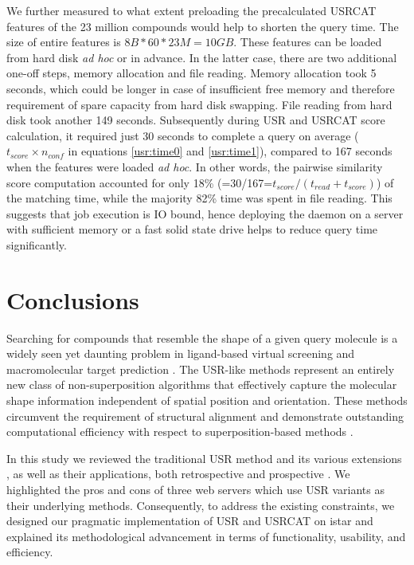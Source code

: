 We further measured to what extent preloading the precalculated USRCAT features of the 23 million compounds would help to shorten the query time. The size of entire features is $8B*60*23M=10GB$. These features can be loaded from hard disk \textit{ad hoc} or in advance. In the latter case, there are two additional one-off steps, memory allocation and file reading. Memory allocation took 5 seconds, which could be longer in case of insufficient free memory and therefore requirement of spare capacity from hard disk swapping. File reading from hard disk took another 149 seconds. Subsequently during USR and USRCAT score calculation, it required just 30 seconds to complete a query on average ($t_{score}\times n_{conf}$ in equations \eqref{usr:time0} and \eqref{usr:time1}), compared to 167 seconds when the features were loaded \textit{ad hoc}. In other words, the pairwise similarity score computation accounted for only 18\% (=30/167=$t_{score}/(t_{read}+t_{score})$) of the matching time, while the majority 82\% time was spent in file reading. This suggests that job execution is IO bound, hence deploying the daemon on a server with sufficient memory or a fast solid state drive helps to reduce query time significantly.

\section{Conclusions}

Searching for compounds that resemble the shape of a given query molecule is a widely seen yet daunting problem in ligand-based virtual screening \citep{1332,1380,1281,1504,1502,1615} and macromolecular target prediction \citep{1407,1408,1402}. The USR-like methods \citep{1379,1338,1331} represent an entirely new class of non-superposition algorithms that effectively capture the molecular shape information independent of spatial position and orientation. These methods circumvent the requirement of structural alignment and demonstrate outstanding computational efficiency with respect to superposition-based methods \citep{1440,887,1439}.

In this study we reviewed the traditional USR method \citep{1379} and its various extensions \citep{1333,1436,1437,1334,1335,1337,1338,1331,1407,1408}, as well as their applications, both retrospective \citep{1332,1331} and prospective \citep{1505,1380,1281,1504,1502,1615}. We highlighted the pros and cons of three web servers \citep{1436,1437,1408} which use USR variants as their underlying methods. Consequently, to address the existing constraints, we designed our pragmatic implementation of USR \citep{1379} and USRCAT \citep{1331} on istar \citep{1362} and explained its methodological advancement in terms of functionality, usability, and efficiency.

